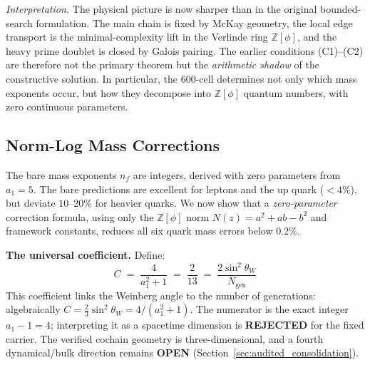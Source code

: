 \documentclass[12pt,a4paper]{article}
\theoremstyle{definition}
\begin{document}
\noindent\textit{Interpretation.}
The physical picture is now sharper than in the original bounded-search formulation.  The main chain is fixed by McKay geometry, the local edge transport is the minimal-complexity lift in the Verlinde ring $\mathbb{Z}[\phi]$, and the heavy prime doublet is closed by Galois pairing.  The earlier conditions (C1)--(C2) are therefore not the primary theorem but the \emph{arithmetic shadow} of the constructive solution.  In particular, the 600-cell determines not only which mass exponents occur, but how they decompose into $\mathbb{Z}[\phi]$ quantum numbers, with zero continuous parameters.


\subsection{Norm-Log Mass Corrections}
\label{sec:normlog}

The bare mass exponents $n_f$ are integers, derived with zero parameters from $a_1 = 5$. The bare predictions are excellent for leptons and the up quark ($< 4\%$), but deviate $10$--$20\%$ for heavier quarks. We now show that a \emph{zero-parameter} correction formula, using only the $\mathbb{Z}[\phi]$ norm $N(z) = a^2 + ab - b^2$ and framework constants, reduces all six quark mass errors below $0.2\%$.

\textbf{The universal coefficient.} Define:
\begin{equation}
\boxed{C \;=\; \frac{4}{a_1^2 + 1} \;=\; \frac{2}{13} \;=\; \frac{2\sin^2\theta_W}{N_{\text{gen}}}}
\label{eq:normlog_coeff}
\end{equation}
This coefficient links the Weinberg angle to the number of generations: algebraically $C=\tfrac23\sin^2\theta_W=4/(a_1^2+1)$.  The numerator is the exact integer $a_1-1=4$; interpreting it as a spacetime dimension is \textbf{REJECTED} for the fixed carrier.  The verified cochain geometry is three-dimensional, and a fourth dynamical/bulk direction remains \textbf{OPEN} (Section~\ref{sec:audited_consolidation}).
\end{document}
